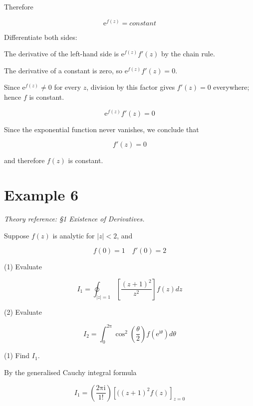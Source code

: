 \documentclass[11pt,a4paper]{article}
\theoremstyle{definition}
\theoremstyle{plain}
\begin{document}
Therefore

\begin{equation}
\mathrm{e}^{f(z)} = constant
\end{equation}

Differentiate both sides:

The derivative of the left-hand side is $\mathrm{e}^{f(z)}f'(z)$ by the chain rule.

The derivative of a constant is zero, so $\mathrm{e}^{f(z)}f'(z) = 0$.

Since $\mathrm{e}^{f(z)} \ne 0$ for every $z$, division by this factor gives $f'(z) = 0$ everywhere; hence $f$ is constant.

\begin{equation}
\mathrm{e}^{f(z)}f'(z) = 0
\end{equation}

Since the exponential function never vanishes, we conclude that

\begin{equation}
f'(z) = 0
\end{equation}

and therefore $f(z)$ is constant.

\section*{Example 6}

\textit{Theory reference: §1 Existence of Derivatives.}

Suppose $f(z)$ is analytic for $\vert{}z\vert{} < 2$, and

\begin{equation}
f(0) = 1\quad f'(0) = 2
\end{equation}

(1) Evaluate

\begin{equation}
I_{1} = \oint_{\vert{}z\vert{} = 1}[\frac{{(z + 1)}^{2}}{z^{2}}]f(z)dz
\end{equation}

(2) Evaluate

\begin{equation}
I_{2} = \int_{0}^{2\mathrm{\pi}}\cos^{2}\left(\frac{\theta}{2}\right)f(\mathrm{e}^{\mathrm{i}\theta}) d\theta
\end{equation}

(1) Find $I_{1}$.

By the generalised Cauchy integral formula

\begin{equation}
I_{1} = \left(\frac{2\mathrm{\pi}\mathrm{i}}{1!}\right){[((z + 1)^{2}f(z)]}_{z = 0}
\end{equation}
\end{document}

